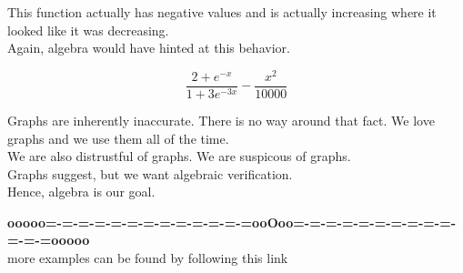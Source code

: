 \documentclass{ximera}
\begin{document}
\begin{example}
This function actually has negative values and is actually increasing where it looked like it was decreasing. \\


Again, algebra would have hinted at this behavior.

\[  \frac{2+e^{-x}}{1+3 e^{-3x}} -\frac{x^2}{10000}     \]


\end{example}



Graphs are inherently inaccurate.  There is no way around that fact.  We love graphs and we use them all of the time. \\

We are also distrustful of graphs.  We are suspicous of graphs. \\

Graphs suggest, but we want algebraic verification. \\

Hence, algebra is our goal.












\begin{center}
\textbf{\textcolor{green!50!black}{ooooo=-=-=-=-=-=-=-=-=-=-=-=-=ooOoo=-=-=-=-=-=-=-=-=-=-=-=-=ooooo}} \\

more examples can be found by following this link\\ 

\end{center}
\end{document}
